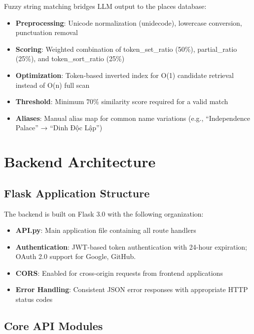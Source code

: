Fuzzy string matching bridges LLM output to the places database:

\begin{itemize}[noitemsep]
    \item \textbf{Preprocessing}: Unicode normalization (unidecode), lowercase conversion, punctuation removal
    \item \textbf{Scoring}: Weighted combination of token\_set\_ratio (50\%), partial\_ratio (25\%), and token\_sort\_ratio (25\%)
    \item \textbf{Optimization}: Token-based inverted index for O(1) candidate retrieval instead of O(n) full scan
    \item \textbf{Threshold}: Minimum 70\% similarity score required for a valid match
    \item \textbf{Aliases}: Manual alias map for common name variations (e.g., ``Independence Palace'' → ``Dinh Độc Lập'')
\end{itemize}

\section{Backend Architecture}

\subsection{Flask Application Structure}

The backend is built on Flask 3.0 with the following organization:

\begin{itemize}[noitemsep]
    \item \textbf{API.py}: Main application file containing all route handlers
    \item \textbf{Authentication}: JWT-based token authentication with 24-hour expiration; OAuth 2.0 support for Google, GitHub.
    \item \textbf{CORS}: Enabled for cross-origin requests from frontend applications
    \item \textbf{Error Handling}: Consistent JSON error responses with appropriate HTTP status codes
\end{itemize}

\subsection{Core API Modules}

